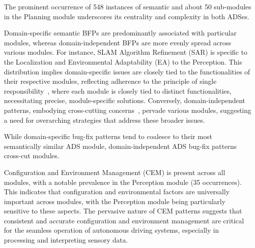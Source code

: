 \vspace{-1ex}
\begin{finding}
\label{finding:rq5_planning}
    The prominent occurrence of 548 instances of semantic \bfps and about 50 sub-modules in the Planning module underscores its centrality and complexity in both ADSes. 
\end{finding}
\vspace{-1ex}


Domain-specific semantic BFPs are predominantly associated with particular modules, whereas domain-independent BFPs are more evenly spread across various modules. For instance, SLAM Algorithm Refinement (SAR) is specific to the Localization and Environmental Adaptability (EA) to the Perception. 
This distribution implies domain-specific issues are closely tied to the functionalities of their respective modules, reflecting adherence to the principle of single responsibility~\cite{martin2000design}, where each module is closely tied to distinct functionalities, necessitating precise, module-specific solutions. 
Conversely, domain-independent patterns, embodying cross-cutting concerns~\cite{crosscutting_concerns,EaddyZSGMNA08}, pervade various modules, suggesting a need for overarching strategies that address these broader issues. 


\vspace{-1ex}
\begin{finding}
\label{finding:rq5_specific_independent}
    While domain-specific bug-fix patterns tend to coalesce to their most semantically similar ADS module, domain-independent ADS bug-fix patterns cross-cut modules. 
\end{finding}
\vspace{-1ex}

Configuration and Environment Management (CEM) is present across all modules, with a notable prevalence in the Perception module (35 occurrences). This indicates that configuration and environmental factors are universally important across modules, with the Perception module being particularly sensitive to these aspects. The pervasive nature of CEM patterns suggests that consistent and accurate configuration and environment management are critical for the seamless operation of autonomous driving systems, especially in processing and interpreting sensory data.


